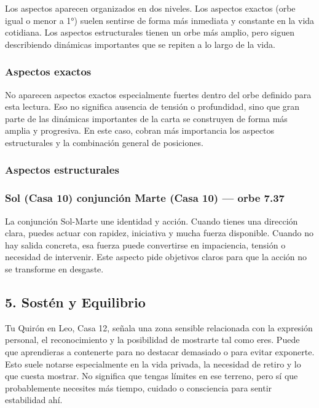 \documentclass[11pt,a4paper]{article}\usepackage[utf8]{inputenc}
\begin{document}
Los aspectos aparecen organizados en dos niveles. Los aspectos exactos (orbe igual o menor a 1°) suelen sentirse de forma más inmediata y constante en la vida cotidiana. Los aspectos estructurales tienen un orbe más amplio, pero siguen describiendo dinámicas importantes que se repiten a lo largo de la vida.



\vspace{0.8cm}
\subsubsection*{Aspectos exactos}
No aparecen aspectos exactos especialmente fuertes dentro del orbe definido para esta lectura. Eso no significa ausencia de tensión o profundidad, sino que gran parte de las dinámicas importantes de la carta se construyen de forma más amplia y progresiva. En este caso, cobran más importancia los aspectos estructurales y la combinación general de posiciones.

\vspace{0.8cm}
\subsubsection*{Aspectos estructurales}
\subsubsection*{Sol (Casa 10) conjunción Marte (Casa 10) --- orbe 7.37\textdegree}
La conjunción Sol-Marte une identidad y acción. Cuando tienes una dirección clara, puedes actuar con rapidez, iniciativa y mucha fuerza disponible. Cuando no hay salida concreta, esa fuerza puede convertirse en impaciencia, tensión o necesidad de intervenir. Este aspecto pide objetivos claros para que la acción no se transforme en desgaste.



\vspace{0.8cm}

\subsection{5. Sostén y Equilibrio}

Tu Quirón en Leo, Casa 12, señala una zona sensible relacionada con la expresión personal, el reconocimiento y la posibilidad de mostrarte tal como eres. Puede que aprendieras a contenerte para no destacar demasiado o para evitar exponerte. Esto suele notarse especialmente en la vida privada, la necesidad de retiro y lo que cuesta mostrar. No significa que tengas límites en ese terreno, pero sí que probablemente necesites más tiempo, cuidado o consciencia para sentir estabilidad ahí.
\end{document}
